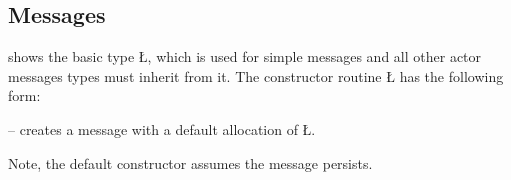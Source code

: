 \documentclass[openright,twoside]{report}
\begin{document}
\subsection{Messages}

 shows the basic type \LGinlinetrue\LGbegin\lgrinde\L{}\endlgrinde\LGend{}, which is used for simple messages and all other actor messages types must inherit from it.
The constructor routine \LGinlinetrue\LGbegin\lgrinde\L{}\endlgrinde\LGend{} has the following form:
\begin{prefix}
\item[\LGinlinetrue\LGbegin\lgrinde\L{\LB{\V{Message}(\0\V{Allocation}\0\V{allocation}\0=\0\V{Nodelete}\0)}}\endlgrinde\LGend{}]
-- creates a message with a default allocation of \LGinlinetrue\LGbegin\lgrinde\L{}\endlgrinde\LGend{}.
\end{prefix}
Note, the default constructor assumes the message persists.
\end{document}
